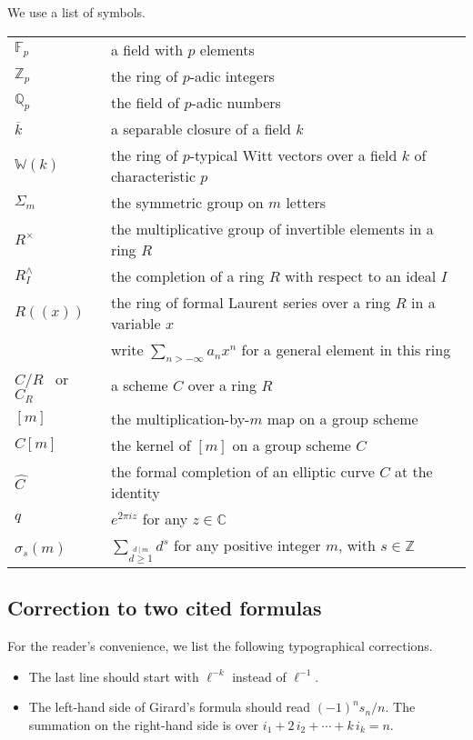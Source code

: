 \documentclass{gtpart}
\theoremstyle{definition}
\theoremstyle{remark}
\newcommand{\mb}[1]{\mathbb{#1}}
\newcommand{\BC}{{\mb C}}
\newcommand{\BF}{{\mb F}}
\newcommand{\BQ}{{\mb Q}}
\newcommand{\BW}{{\mb W}}
\newcommand{\BZ}{{\mb Z}}
\newcommand{\HC}{\widehat{C~}\!}
\newcommand{\si}{\sigma}
\renewcommand{\=}{\approx}
\renewcommand{\-}{\sim}
\numberwithin{equation}{section}
\numberwithin{thm}{section}
\begin{document}
We use a list of symbols.  
\begin{center}
 \begin{tabular}{ll}
  $\BF_p$ & a field with $p$ elements \\
  $\BZ_p$ & the ring of $p$-adic integers \\
  $\BQ_p$ & the field of $p$-adic numbers \\
  $\overline{k}$ & a separable closure of a field $k$ \\
  $\BW(k)$ & the ring of $p$-typical Witt vectors over a field $k$ of 
             characteristic $p$ \\
  $\Sigma_m$ & the symmetric group on $m$ letters \\
  $R^\times$ & the multiplicative group of invertible elements in a ring $R$ \\
  $R_I^\wedge$ & the completion of a ring $R$ with respect to an ideal $I$ \\
  $R(\!(x)\!)$ & the ring of formal Laurent series over a ring $R$ in a variable 
                 $x$ \\
               & write $\sum_{n > -\infty} a_n x^n$ for a general element in 
                 this ring \\
  $C/R$ \, or \, $C_R$ & a scheme $C$ over a ring $R$ \\
  $[m]$ & the multiplication-by-$m$ map on a group scheme \\
  $C[m]$ & the kernel of $[m]$ on a group scheme $C$ \\
  $\HC$ & the formal completion of an elliptic curve $C$ at the identity \\
  $q$ & $e^{2 \pi i z}$ for any $z \in \BC$ \\
  $\si_s(m)$ & $\displaystyle \sum_{\stackrel{\scriptstyle d~\!|~\!m}{d \geq 1}} d^s$ 
               for any positive integer $m$, with $s \in \BZ$ 
 \end{tabular}
\end{center}



\subsection{Correction to two cited formulas}

For the reader's convenience, we list the following typographical corrections.  
\begin{itemize}
 \item \cite[(1.11.0.4)]{padicprop} The last line should start with $\ell^{-k}$ 
 instead of $\ell^{-1}$.  

 \item \cite[Problem 16-A]{cc} The left-hand side of Girard's formula should 
 read $(-1)^n s_n / n$.  The summation on the right-hand side is over 
 $i_1 + 2\,i_2 + \cdots + k\,i_k = n$.  
\end{itemize}
\end{document}
